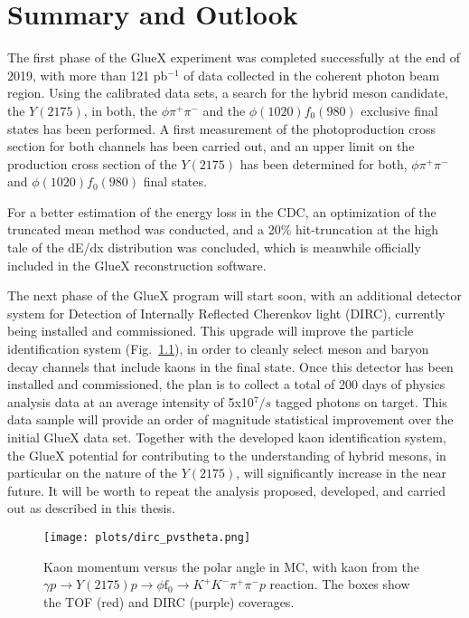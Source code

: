 \chapter{Summary and Outlook}
\label{chap.summ}

The first phase of the GlueX experiment was completed successfully at the end of 2019, with more than 121 pb$^{-1}$ of data collected in the coherent photon beam region. Using the calibrated data sets, a search for the hybrid meson candidate, the $Y(2175)$, in both, the $\phi\pi^{+}\pi^{-}$ and the $\phi(1020) f_0(980)$ exclusive final states has been performed. A first measurement of the photoproduction cross section for both channels has been carried out, and an upper limit on the production cross section of the $Y(2175)$ has been determined for both, $\phi\pi^{+}\pi^{-}$ and $\phi(1020)f_0(980)$ final states.
~\par For a better estimation of the energy loss in the CDC, an optimization of the truncated mean method was conducted, and a 20$\%$ hit-truncation at the high tale of the dE/dx distribution was concluded, which is meanwhile officially included in the GlueX reconstruction software.
~\par The next phase of the GlueX program will start soon, with an additional detector system for Detection of Internally Reflected Cherenkov light (DIRC), currently being installed and commissioned. This upgrade will improve the particle identification system (Fig.~\ref{fig.summ}), in order to cleanly select meson and baryon decay channels that include kaons in the final state. Once this detector has been installed and commissioned, the plan is to collect a total of 200 days of physics analysis data at an average intensity of 5x10$^{7}/s$ tagged photons on target. This data sample will provide an order of magnitude statistical improvement over the initial GlueX data set. Together with the developed kaon identification system, the GlueX potential for contributing to the understanding of hybrid mesons, in particular on the nature of the $Y(2175)$, will significantly increase in the near future. It will be worth to repeat the analysis proposed, developed, and carried out as described in this thesis.    


\begin{figure}[htbp]
    \centering
    \texttt{[image: plots/dirc\_pvstheta.png]}
    \caption{Kaon momentum versus the polar angle in MC, with kaon from the $\gamma p \rightarrow Y(2175) p \rightarrow \phi \mathrm{f}_0  \rightarrow  K^{+} K^{-} \pi^{+} \pi^{-} p$ reaction. The boxes show the TOF (red) and DIRC (purple) coverages.}
    \label{fig.summ}
\end{figure}

